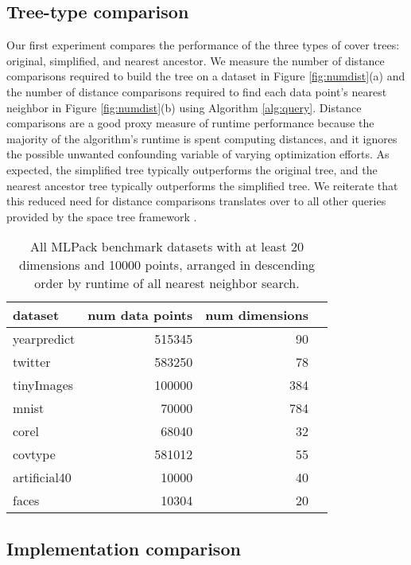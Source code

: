 \documentclass[../main.tex]{subfiles}
\begin{document}
\subsection{Tree-type comparison}

Our first experiment compares the performance of the three types of cover trees: original, simplified, and nearest ancestor.
We measure the number of distance comparisons required to build the tree on a dataset in Figure \ref{fig:numdist}(a)
and the number of distance comparisons required to find each data point's nearest neighbor in Figure \ref{fig:numdist}(b) using Algorithm \ref{alg:query}.
Distance comparisons are a good proxy measure of runtime performance because the majority of the algorithm's runtime is spent computing distances, and it ignores the possible unwanted confounding variable of varying optimization efforts.
As expected, the simplified tree typically outperforms the original tree, and the nearest ancestor tree typically outperforms the simplified tree.
We reiterate that this reduced need for distance comparisons translates over to all other queries provided by the space tree framework \cite{Curtin2013}.

\begin{table}[t]
\centering
\begin{tabular}{lrrr}
dataset & num data points & num dimensions \\
\hline
yearpredict  & 515345& 90   \\
twitter      & 583250& 78   \\
tinyImages   & 100000& 384  \\
mnist        & 70000 & 784  \\
corel        & 68040 & 32   \\
covtype      & 581012& 55   \\
artificial40 & 10000 & 40   \\
faces        & 10304 & 20   \\
\end{tabular}
\caption{
    All MLPack benchmark datasets with at least 20 dimensions and 10000
points, arranged in descending order by runtime of all nearest neighbor search.
    }
\label{tab:datasets}
\end{table}

\subsection{Implementation comparison}
\end{document}

